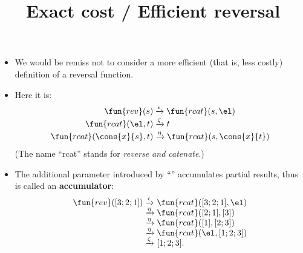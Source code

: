 \documentclass[wide]{slides}
\begin{document}
\begin{slide}
  \title{Exact cost / Efficient reversal}

  \begin{itemize}

    \item We would be remiss not to consider a more efficient (that
      is, less costly) definition of a reversal function.

    \item Here it is:
      \begin{align*}
        \fun{rev}(s) &\xrightarrow{\epsilon} \fun{rcat}(s,\el)\\
        \fun{rcat}(\el,t) & \xrightarrow{\smash{\zeta}} t\\
        \fun{rcat}(\cons{x}{s},t) &\xrightarrow{\smash{\eta}}
        \fun{rcat}(s,\cons{x}{t})
      \end{align*}
      (The name ``rcat'' stands for \emph{reverse and catenate}.)

    \item The additional parameter introduced by ``''
      accumulates partial results, thus is called an
      \textbf{accumulator}:
      \begin{equation*}
        \begin{array}{r@{\;}l@{\;}l}
          \fun{rev}([3;2;1])
          & \xrightarrow{\epsilon} & \fun{rcat}([3;2;1],\el)\\
          & \xrightarrow{\smash{\eta}}     & \fun{rcat}([2;1],[3])\\
          & \xrightarrow{\smash{\eta}}     & \fun{rcat}([1],[2;3])\\
          & \xrightarrow{\smash{\eta}}     & \fun{rcat}(\el,[1;2;3])\\
          & \xrightarrow{\smash{\zeta}}    & [1;2;3].
        \end{array}
      \end{equation*}

  \end{itemize}

\end{slide}
\end{document}

